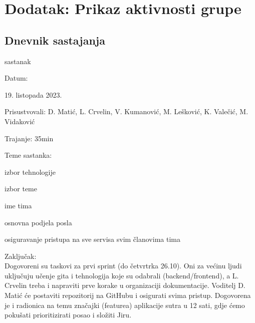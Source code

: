 \chapter*{Dodatak: Prikaz aktivnosti grupe}
		
		\section*{Dnevnik sastajanja}
		
		\begin{packed_enum}
			\item  sastanak
			
			\item[] \begin{packed_item}
				\item Datum: \date[{19. listopada 2023.} %
				\item Prisustvovali: D. Matić, L. Crvelin, V. Kumanović, M. Lešković, K. Valečić, M. Vidaković
				\item Trajanje: 35min
				\item Teme sastanka:
				\begin{packed_item}
					\item  izbor tehnologije
					\item  izbor teme
                    \item  ime tima
                    \item  osnovna podjela posla
                    \item  osiguravanje pristupa na sve servisa svim članovima tima
				\end{packed_item}
            \item Zaključak: \\Dogovoreni su taskovi za prvi sprint (do četvrtrka 26.10). Oni za većinu ljudi uključuju učenje gita i tehnologija koje su odabrali (backend/frontend), a L. Crvelin treba i napraviti prve korake u organizaciji dokumentacije. Voditelj D. Matić će postaviti repozitorij na GitHubu i osigurati svima pristup. Dogovorena je i radionica na temu značajki (featurea) aplikacije sutra u 12 sati, gdje ćemo pokušati prioritizirati posao i složiti Jiru.
			\end{packed_item}


\end{packed_enum}
